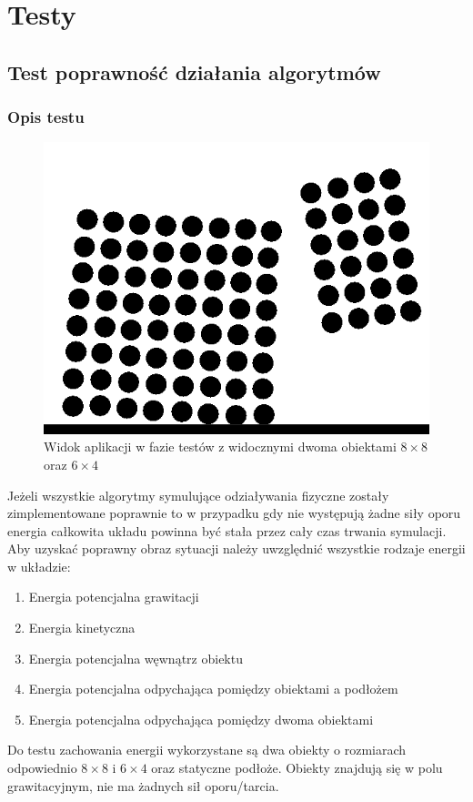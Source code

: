 \documentclass[12pt, letterpaper]{report}
\begin{document}
\chapter{Testy}
    \section{Test poprawność działania algorytmów}
    \subsection{Opis testu}
    
    \begin{figure}
        \includegraphics[width=0.9\linewidth]{objects_raw} 
        \caption{Widok aplikacji w fazie testów z widocznymi dwoma obiektami $8 \times 8$ oraz $6 \times 4$}
    \end{figure}
    Jeżeli wszystkie algorytmy symulujące odziaływania fizyczne zostały zimplementowane poprawnie 
    to w przypadku gdy nie występują żadne siły oporu energia całkowita układu powinna 
    być stała przez cały czas trwania symulacji. Aby uzyskać poprawny obraz sytuacji należy 
    uwzględnić wszystkie rodzaje energii w układzie: 
    \begin{enumerate}
        \item Energia potencjalna grawitacji
        \item Energia kinetyczna
        \item Energia potencjalna węwnątrz obiektu
        \item Energia potencjalna odpychająca pomiędzy obiektami a podłożem
        \item Energia potencjalna odpychająca pomiędzy dwoma obiektami
    \end{enumerate}
    Do testu zachowania energii wykorzystane są 
    dwa obiekty o rozmiarach odpowiednio $8 \times 8$ i $6 \times 4$ oraz statyczne podłoże. Obiekty
    znajdują się w polu grawitacyjnym, nie ma żadnych sił oporu/tarcia.
\end{document}
